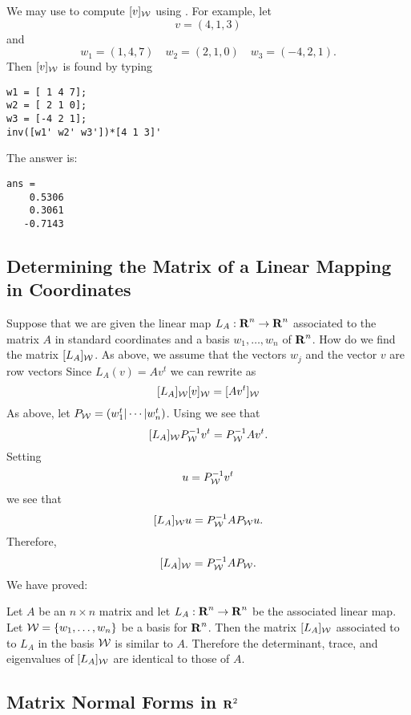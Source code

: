 We may use  to compute $[v]_{\cal W}$ using
\Matlabp.  For example, let
\[
v  =  (4,1,3)
\]
and
\[
w_1 =  (1,4,7) \quad w_2 = (2,1,0) \quad w_3 = (-4,2,1).
\]
Then $[v]_{\cal W}$ is found by typing
\begin{verbatim}
w1 = [ 1 4 7];
w2 = [ 2 1 0];
w3 = [-4 2 1];
inv([w1' w2' w3'])*[4 1 3]'
\end{verbatim}   
The answer is:

\begin{verbatim}
ans =
    0.5306
    0.3061
   -0.7143
\end{verbatim}


\subsection*{Determining the Matrix of a Linear Mapping in Coordinates}

Suppose that we are given the linear map $L_A:\mbox{$\bf{R}$}^n\to\mbox{$\bf{R}$}^n$ associated to
the matrix $A$ in standard coordinates and a basis $w_1,\ldots,w_n$ of $\mbox{$\bf{R}$}^n$.
How do we find the matrix $[L_A]_{\cal W}$. As above, we assume that the
vectors $w_j$ and the vector $v$ are row vectors  Since $L_A(v)=Av^t$ we can
rewrite  as
\[
[L_A]_{\cal W}[v]_{\cal W} = [Av^t]_{\cal W}
\]
As above, let $P_{\cal W}=(w_1^t|\cdots|w_n^t)$.  Using  we
see that
\[
[L_A]_{\cal W}P_{\cal W}^{-1} v^t = P_{\cal W}^{-1} Av^t.
\]
Setting
\[
u= P_{\cal W}^{-1} v^t
\]
we see that
\[
[L_A]_{\cal W}u = P_{\cal W}^{-1} A P_{\cal W}u.
\]
Therefore,
\[
[L_A]_{\cal W} = P_{\cal W}^{-1} AP_{\cal W}.
\]
We have proved:
\begin{thm}
Let $A$ be an $n\times n$ matrix and let $L_A:\mbox{$\bf{R}$}^n\to\mbox{$\bf{R}$}^n$ be the associated
linear map.  Let ${\cal W} = \{w_1,\ldots,w_n\}$ be a basis for
$\mbox{$\bf{R}$}^n$.  Then the matrix $[L_A]_{\cal W}$ associated to to $L_A$ in the basis
${\cal W}$ is similar to $A$.  Therefore the determinant, trace,
and eigenvalues of $[L_A]_{\cal W}$ are identical to those of $A$.
\end{thm}




\subsection*{Matrix Normal Forms in $\mbox{$\bf{R}$}^2$} 

